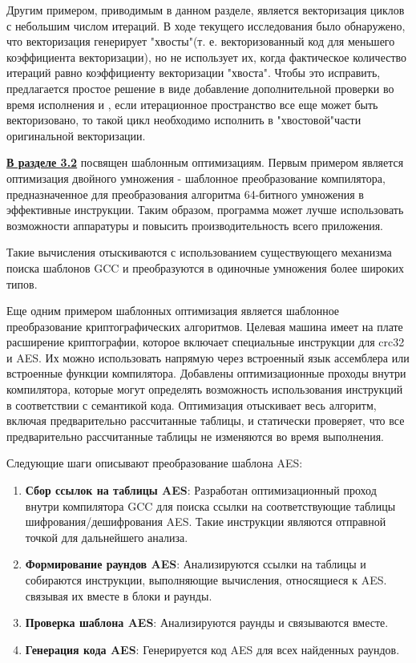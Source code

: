 Другим примером, приводимым в данном разделе, является  векторизация циклов с небольшим числом итераций.  В ходе текущего исследования было обнаружено, что векторизация
генерирует "хвосты"\phantom{ }(т. е. векторизованный код для меньшего коэффициента
векторизации), но не использует их, когда фактическое количество итераций
равно коэффициенту векторизации "хвоста".  Чтобы это исправить, предлагается простое решение в виде добавление дополнительной проверки во время исполнения и , если итерационное пространство все еще может быть векторизовано, то такой цикл необходимо исполнить в "хвостовой"\phantom{ }части оригинальной векторизации.

 \underline{\textbf{В разделе 3.2}} посвящен шаблонным  оптимизациям. Первым примером является оптимизация двойного умножения - шаблонное преобразование
 компилятора, предназначенное для преобразования алгоритма 64-битного умножения
 в эффективные инструкции. Таким образом, программа может лучше
 использовать возможности аппаратуры и повысить производительность всего
 приложения.
 
 Такие вычисления отыскиваются с использованием существующего механизма поиска шаблонов GCC и преобразуются в одиночные умножения более широких типов.
 
 
 Еще одним примером шаблонных оптимизация является шаблонное преобразование криптографических алгоритмов. Целевая машина имеет на плате расширение криптографии,
 которое включает специальные инструкции для crc32 и AES. Их можно использовать
 напрямую через встроенный язык ассемблера или встроенные функции
 компилятора. Добавлены оптимизационные проходы внутри компилятора, которые могут определять
 возможность использования инструкций в соответствии с семантикой
 кода.
 Оптимизация отыскивает весь алгоритм, включая предварительно
 рассчитанные таблицы, и статически проверяет, что все предварительно
 рассчитанные таблицы не изменяются во время выполнения.
 
 Следующие шаги описывают преобразование шаблона AES:
 \begin{enumerate}
 	\item \textbf{Сбор ссылок на таблицы AES}: Разработан оптимизационный проход внутри компилятора GCC для поиска ссылки на соответствующие таблицы шифрования/дешифрования AES. Такие инструкции являются отправной точкой для дальнейшего анализа.
 	\item \textbf{Формирование раундов AES}: Анализируются ссылки на таблицы и собираются инструкции, выполняющие вычисления, относящиеся к AES. связывая их вместе в блоки и раунды.
 	\item \textbf{Проверка шаблона AES}: Анализируются раунды и связываются вместе.
 	\item \textbf{Генерация кода AES}: Генерируется код AES для всех найденных раундов.
 \end{enumerate}
 
